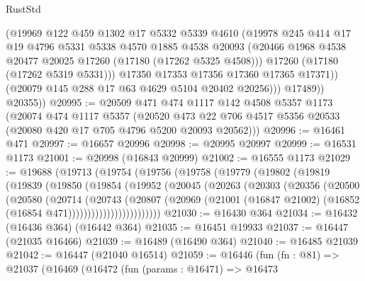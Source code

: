 \begin{lexlean}{RustStd}
\begin{coremodule}
                  (@19969
                    @122
                    @459
                    @1302
                    @17
                    @5332
                    @5339
                    @4610
                    (@19978
                      @245
                      @414
                      @17
                      @19
                      @4796
                      @5331
                      @5338
                      @4570
                      @1885
                      @4538
                      @20093
                      (@20466 @1968 @4538 @20477 @20025 @17260 (@17180 (@17262 @5325 @4508)))
                      @17260
                      (@17180 (@17262 @5319 @5331)))
                    @17350
                    @17353
                    @17356
                    @17360
                    @17365
                    @17371))
                (@20079 @145 @288 @17 @63 @4629 @5104 @20402 @20256)))
            @17489))
        @20355))
@20995 := @20509
    @471
    @474
    @1117
    @142
    @4508
    @5357
    @1173
    (@20074
      @474
      @1117
      @5357
      (@20520 @473 @22 @706 @4517 @5356 @20533 (@20080 @420 @17 @705 @4796 @5200 @20093 @20562)))
@20996 := @16461 @471
@20997 := @16657 @20996
@20998 := @20995 @20997
@20999 := @16531 @1173
@21001 := @20998 (@16843 @20999)
@21002 := @16555 @1173
@21029 := @19688
    (@19713
      (@19754
        (@19756
          (@19758
            (@19779
              (@19802
                (@19819
                  (@19839
                    (@19850
                      (@19854
                        (@19952
                          (@20045
                            (@20263
                              (@20303
                                (@20356
                                  (@20500
                                    (@20580
                                      (@20714
                                        (@20743
                                          (@20807
                                            (@20969
                                              (@21001
                                                (@16847 @21002)
                                                (@16852 (@16854 @471))))))))))))))))))))))))
@21030 := @16430 @364
@21034 := @16432 (@16436 @364) (@16442 @364)
@21035 := @16451 @19933
@21037 := @16447 (@21035 @16466)
@21039 := @16489 (@16490 @364)
@21040 := @16485 @21039
@21042 := @16447 (@21040 @16514)
@21059 := @16446
    (fun (fn : @81) =>
    @21037
      (@16469
        (@16472
          (fun (params : @16471) =>
          @16473

\end{coremodule}
\end{lexlean}
